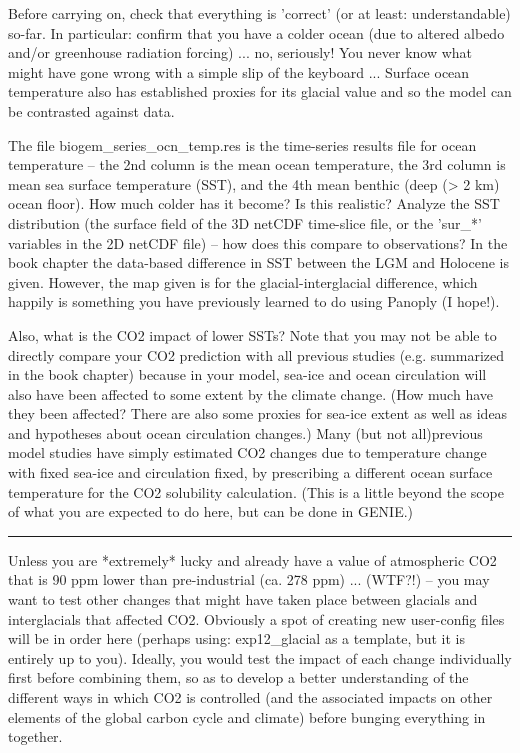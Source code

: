 \documentclass[11pt,fleqn]{book} %
\begin{document}
Before carrying on, check that everything is 'correct' (or at least: understandable) so-far. In
particular: confirm that you have a colder ocean (due to altered albedo and/or greenhouse
radiation forcing) ... no, seriously! You never know what might have gone wrong with a simple slip
of the keyboard ... Surface ocean temperature also has established proxies for its glacial value and
so the model can be contrasted against data.

The file biogem\_series\_ocn\_temp.res is the time-series results file for ocean temperature – the
2nd column is the mean ocean temperature, the 3rd column is mean sea surface temperature
(SST), and the 4th mean benthic (deep (> 2 km) ocean floor). How much colder has it become? Is
this realistic? Analyze the SST distribution (the surface field of the 3D netCDF time-slice file, or the
'sur\_*' variables in the 2D netCDF file) – how does this compare to observations? In the book
chapter the data-based difference in SST between the LGM and Holocene is given. However, the
map given is for the glacial-interglacial difference, which happily is something you have previously
learned to do using Panoply (I hope!).

Also, what is the CO2 impact of lower SSTs? Note that you may not be able to directly compare
your CO2 prediction with all previous studies (e.g. summarized in the book chapter) because in
your model, sea-ice and ocean circulation will also have been affected to some extent by the
climate change. (How much have they been affected? There are also some proxies for sea-ice
extent as well as ideas and hypotheses about ocean circulation changes.) Many (but not all)previous model studies have simply estimated CO2 changes due to temperature change with fixed
sea-ice and circulation fixed, by prescribing a different ocean surface temperature for the CO2
solubility calculation. (This is a little beyond the scope of what you are expected to do here, but can
be done in GENIE.)

\vspace{1mm}
\noindent\rule{4cm}{0.5pt}
\vspace{2mm}

Unless you are *extremely* lucky and already have a value of atmospheric CO2 that is 90 ppm
lower than pre-industrial (ca. 278 ppm) ... (WTF?!) – you may want to test other changes that might
have taken place between glacials and interglacials that affected CO2. Obviously a spot of creating
new user-config files will be in order here (perhaps using: exp12\_glacial as a template, but it is
entirely up to you). Ideally, you would test the impact of each change individually first before
combining them, so as to develop a better understanding of the different ways in which CO2 is
controlled (and the associated impacts on other elements of the global carbon cycle and climate)
before bunging everything in together.
\end{document}
